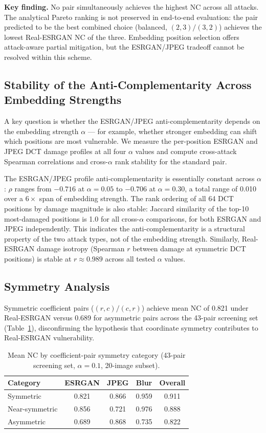 \documentclass[conference]{IEEEtran}
\begin{document}
\textbf{Key finding.} No pair simultaneously achieves the highest NC
across all attacks. The analytical Pareto ranking is not preserved in
end-to-end evaluation: the pair predicted to be the best combined
choice (balanced, $(2,3)/(3,2)$) achieves the lowest Real-ESRGAN NC of
the three. Embedding position selection offers attack-aware partial
mitigation, but the ESRGAN/JPEG tradeoff cannot be resolved within this
scheme.

\subsection{Stability of the Anti-Complementarity Across Embedding Strengths}

A key question is whether the ESRGAN/JPEG anti-complementarity depends
on the embedding strength $\alpha$ --- for example, whether stronger
embedding can shift which positions are most vulnerable. We measure the
per-position ESRGAN and JPEG DCT damage profiles at all four $\alpha$
values and compute cross-attack Spearman correlations and cross-$\alpha$
rank stability for the standard pair.

The ESRGAN/JPEG profile anti-complementarity is essentially constant
across $\alpha$: $\rho$ ranges from $-0.716$ at $\alpha=0.05$ to
$-0.706$ at $\alpha=0.30$, a total range of 0.010 over a $6\times$ span
of embedding strength. The rank ordering of all 64 DCT positions by
damage magnitude is also stable: Jaccard similarity of the top-10
most-damaged positions is 1.0 for all cross-$\alpha$ comparisons, for
both ESRGAN and JPEG independently. This indicates the anti-complementarity
is a structural property of the two attack types, not of the embedding
strength. Similarly, Real-ESRGAN damage isotropy (Spearman $r$ between
damage at symmetric DCT positions) is stable at $r \approx 0.989$
across all tested $\alpha$ values.

\subsection{Symmetry Analysis}

Symmetric coefficient pairs ($(r,c)/(c,r)$) achieve mean NC of 0.821
under Real-ESRGAN versus 0.689 for asymmetric pairs across the 43-pair
screening set (Table~\ref{tab:symmetry}), disconfirming the hypothesis
that coordinate symmetry contributes to Real-ESRGAN vulnerability.

\begin{table}[t]
\caption{Mean NC by coefficient-pair symmetry category (43-pair
screening set, $\alpha=0.1$, 20-image subset).}
\label{tab:symmetry}
\centering
\begin{tabular}{lcccc}
\toprule
Category & ESRGAN & JPEG & Blur & Overall \\
\midrule
Symmetric      & 0.821 & 0.866 & 0.959 & 0.911 \\
Near-symmetric & 0.856 & 0.721 & 0.976 & 0.888 \\
Asymmetric     & 0.689 & 0.868 & 0.735 & 0.822 \\
\bottomrule
\end{tabular}
\end{table}
\end{document}
